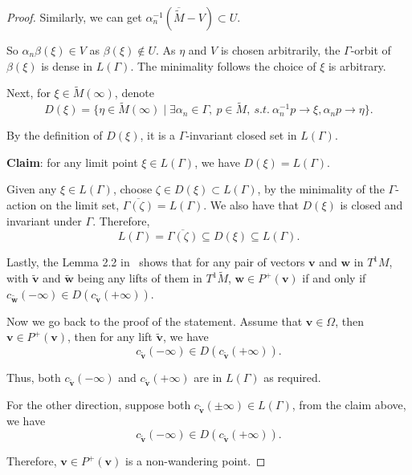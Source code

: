 \documentclass[reqno,11pt]{article}
\theoremstyle{definition}
\theoremstyle{remark}
\numberwithin{equation}{section}
\begin{document}
\begin{proof}
    Similarly, we can get $\alpha_n^{-1}(\overline{\widetilde{M}}-V)\subset U$.

	So $\alpha_n\beta(\xi)\in V$ as $\beta(\xi)\notin U$. As $\eta$ and $V$ is chosen arbitrarily, the $\Gamma$-orbit of $\beta(\xi)$ is dense in $L(\Gamma)$. The minimality follows the choice of $\xi$ is arbitrary.

	Next, for $\xi\in\widetilde{M}(\infty)$, denote
	\begin{displaymath}
		D(\xi)=\{\eta\in\widetilde{M}(\infty)\mid\exists \alpha_n\in\Gamma,~p\in\widetilde{M},~{s.t.}~\alpha_n^{-1}p\to\xi, \alpha_n p\to\eta\}.
	\end{displaymath}

	By the definition of $D(\xi)$, it is a $\Gamma$-invariant closed set in $L(\Gamma)$.

	\textbf{Claim}: for any limit point $\xi\in L(\Gamma)$, we have $D(\xi)=L(\Gamma)$.

	Given any $\xi\in L(\Gamma)$, choose $\zeta\in D(\xi)\subset L(\Gamma)$, by the minimality of the $\Gamma$-action on the limit set, $\overline{\Gamma(\zeta)}=L(\Gamma)$. We also have that $D(\xi)$ is closed and invariant under $\Gamma$. Therefore,
	\begin{displaymath}
		L(\Gamma)=\overline{\Gamma(\zeta)}\subseteq D(\xi)\subseteq L(\Gamma).
	\end{displaymath}

    Lastly, the Lemma 2.2 in~\cite{LZ} shows that for any pair of vectors $\bm{v}$ and $\bm{w}$ in $T^1 M$, with $\widetilde{\bm{v}}$ and $\widetilde{\bm{w}}$ being any lifts of them in $T^1\widetilde{M}$, $\bm{w}\in P^{+}(\bm{v})$ if and only if $c_{\widetilde{\bm{w}}}(-\infty)\in D(c_{\widetilde{\bm{v}}}(+\infty))$.

	Now we go back to the proof of the statement. Assume that $\bm{v}\in\Omega$, then $\bm{v}\in P^{+}(\bm{v})$, then for any lift $\widetilde{\bm{v}}$, we have
	\begin{displaymath}
		c_{\widetilde{\bm{v}}}(-\infty)\in D(c_{\widetilde{\bm{v}}}(+\infty)).
	\end{displaymath}

	Thus, both $c_{\widetilde{\bm{v}}}(-\infty)$ and $c_{\widetilde{\bm{v}}}(+\infty)$ are in $L(\Gamma)$ as required.

	For the other direction, suppose both $c_{\widetilde{\bm{v}}}(\pm\infty)\in L(\Gamma)$, from the claim above, we have
	\begin{displaymath}
		c_{\widetilde{\bm{v}}}(-\infty)\in D(c_{\widetilde{\bm{v}}}(+\infty)).
	\end{displaymath}

	Therefore, $\bm{v}\in P^{+}(\bm{v})$ is a non-wandering point.
\end{proof}
\end{document}
